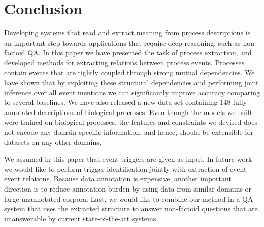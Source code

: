 \section{Conclusion}

Developing systems that read and extract meaning from process descriptions is an important step towards applications that require deep reasoning, such as non-factoid QA. In this paper we have presented the task of process extraction, and developed methods for extracting relations between process events. Processes contain events that are  tightly coupled through strong mutual dependencies. We have shown that by exploiting these structural dependencies and performing joint inference over all event mentions we can significantly improve accuracy comparing to several baselines. We have also released a new data set containing 148 fully annotated descriptions of biological processes. Even though the models we built were trained on biological processes, the features and constraints we devised does not encode any domain specific information, and hence, should be extensible for datasets on any other domains.

We assumed in this paper that event triggers are given as input. In future work we would like to perform trigger identification jointly with extraction of event-event relations. Because data annotation is expensive, another important direction is to reduce annotation burden by using data from similar domains or large unannotated corpora. Last, we would like to combine our method in a QA system that uses the extracted structure to answer non-factoid questions that are unanswerable by current state-of-the-art systems.
